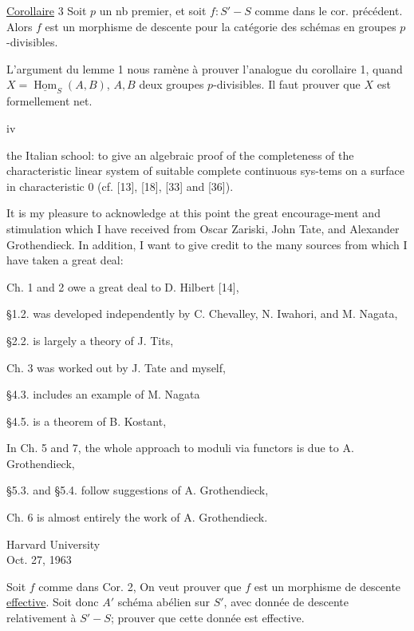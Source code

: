 \uline{Corollaire} 3 Soit $p$ un nb premier, et soit $f:S'\mathbin{-}S$ comme dans le cor. précédent. Alors $f$ est un morphisme de descente pour la catégorie des  schémas en groupes $p$-divisibles.

L'argument  du lemme 1 nous ramène à prouver l'analogue du corollaire 1, quand $X=\underline{\operatorname{Hom}}_S(A,B)$, $A,B$ deux groupes $p$-divisibles. Il faut prouver que $X$ est formellement net.

\begin{center}iv\end{center}
the Italian school: to give an algebraic proof of the completeness of the characteristic linear system of suitable complete continuous sys-tems on a surface in characteristic 0 (cf. [13], [18], [33] and [36]).

It is my pleasure to acknowledge at this point the great encourage-ment and stimulation which I have received from Oscar Zariski, John Tate, and Alexander Grothendieck. In addition, I want to give credit to the many sources from which I have taken a great deal:

Ch. 1 and 2 owe a great deal to D. Hilbert [14],

\S1.2. was developed independently by C. Chevalley, N. Iwahori, and M. Nagata,

\S2.2. is largely a theory of J. Tits,

Ch. 3 was worked out by J. Tate and myself,

\S4.3. includes an example of M. Nagata

\S4.5. is a theorem of B. Kostant,

In Ch. 5 and 7, the whole approach to moduli via functors is due to A. Grothendieck,

\S5.3. and \S5.4. follow suggestions of A. Grothendieck,

Ch. 6 is almost entirely the work of A. Grothendieck.

\begin{flushright}Harvard University\\Oct. 27, 1963\end{flushright}

Soit $f$ comme dans Cor. 2,  On veut prouver que $f$ est un morphisme de descente \uline{effective}. Soit donc $A'$ schéma abélien sur $S'$, avec donnée de descente relativement à $S'\mathbin{-}S$; prouver que cette donnée est effective.

